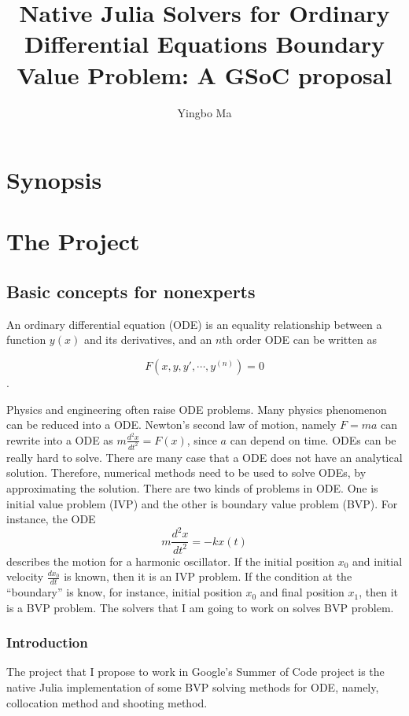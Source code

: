 \documentclass[a4paper,12pt,onecolumn]{article}
\author{Yingbo Ma}
\title{Native Julia Solvers for Ordinary Differential Equations Boundary Value Problem: A GSoC proposal}
\begin{document}
\maketitle
\tableofcontents

\section{Synopsis} %
\label{sec:synopsis}


\section{The Project} %
\label{sec:the_project}

\subsection{Basic concepts for nonexperts} %
\label{sub:basic_concepts_for_nonexperts}
An ordinary differential equation (ODE)  is an equality relationship between a function $y(x)$
and its derivatives, and an $n$th order ODE can be written as

\[F(x, y, y', \cdots, y^{(n)}) = 0\].

Physics and engineering often raise ODE problems. Many physics phenomenon can be reduced into a
ODE. Newton's second law of motion, namely $F=ma$ can rewrite into a ODE as $m\frac{d^2x}{dt^2}
=F(x)$, since $a$ can depend on time. ODEs can be really hard to solve. There are many case that
a ODE does not have an analytical solution. Therefore, numerical methods need to be used to solve
ODEs, by approximating the solution. There are two kinds of problems in ODE. One is initial
value problem (IVP) and the other is boundary value problem (BVP). For instance, the ODE
\[m\frac{d^2x}{dt^2} = -kx(t)\]
describes the motion for a harmonic oscillator. If the initial position $x_0$ and initial velocity
$\frac{dx_0}{dt}$ is known, then it is an IVP problem. If the condition at the ``boundary'' is know,
for instance, initial position $x_0$ and final position $x_1$, then it is a BVP problem. The solvers
that I am going to work on solves BVP problem.

\subsubsection{Introduction} %
\label{ssub:introduction}
The project that I propose to work in Google's Summer of Code project is the native Julia implementation
of some BVP solving methods for ODE, namely, collocation method and shooting method.
\end{document}
